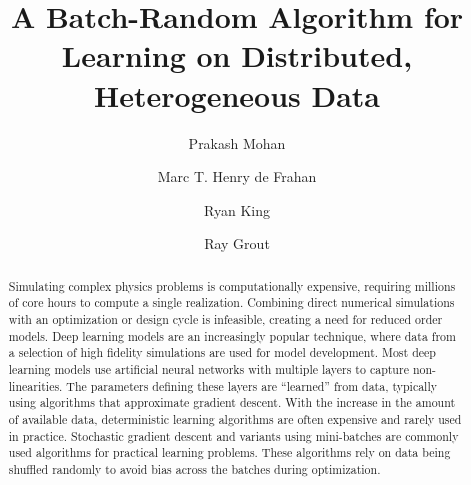 \documentclass[1p]{elsarticle}
\begin{document}
\begin{frontmatter}
\title{A Batch-Random Algorithm for Learning on Distributed, Heterogeneous Data}
\author[ut]{Prakash Mohan}
\author[nrel]{Marc T. Henry de Frahan}
\author[nrel]{Ryan King}
\author[nrel]{Ray Grout}
\address[ut]{Institute for Computational Engineering and Sciences, The University of Texas at Austin, 201 E. 24th Street, POB 4.102, Austin, Texas 78712, USA}
\address[nrel]{Computational Science Center, National Renewable Energy Laboratory, 15013 Denver W Pkwy, ESIF301, Golden, CO 80401, USA}

\begin{abstract}
Simulating complex physics problems is computationally expensive, requiring
millions of core hours to compute a single realization. Combining
direct numerical simulations with an optimization or design cycle is infeasible, creating a need for reduced order models. Deep learning models are an increasingly popular technique, where
data from a selection of high fidelity simulations are used for model development. Most deep learning models use artificial neural networks with
multiple layers to capture non-linearities. The parameters defining
these layers are ``learned'' from data,
typically using algorithms that approximate gradient descent. With the increase
in the amount of available data, deterministic learning algorithms
are often expensive and rarely used in practice. Stochastic gradient descent
and variants using mini-batches are commonly used
algorithms for practical learning problems. These algorithms rely on
data being shuffled randomly to avoid bias across the batches during optimization.


\end{abstract}
\end{frontmatter}
\end{document}
